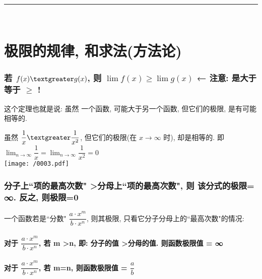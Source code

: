 \documentclass[UTF8]{ctexart}
\begin{document}
~\\
\hrule
~\\


\part{极限的规律, 和求法(方法论)}




\section{若 $ f(x) \textgreater g(x) $, 则 $ \lim f(x) \geq \lim g(x)$  ← 注意: 是大于等于 $\geq$ !}

这个定理也就是说: 虽然 一个函数, 可能大于另一个函数, 但它们的极限, 是有可能相等的. \\

\begin{myEnvSample}
	虽然 $ \dfrac{1} {x} \textgreater \dfrac{1} {x^2}$, 但它们的极限(在 $x \to \infty$ 时), 却是相等的.  即 $ \lim_{n\rightarrow \infty}\dfrac{1}{x}=\lim_{n\rightarrow \infty}\dfrac{1}{x^2}=0
	$ 
	\\
	
	\texttt{[image: /0003.pdf]}
\end{myEnvSample}




\section{分子上``项的最高次数" \textgreater 分母上``项的最高次数", 则 该分式的极限= ∞. 反之, 则极限=0}

一个函数若是``分数" $ \dfrac{a \cdot x^m}{b \cdot x^n} $, 则其极限, 只看它分子分母上的``最高次数"的情况:






\subsection{对于 $ \dfrac{a \cdot x^m}{b \cdot x^n} $, 若 m \textgreater n, 即: 分子的值 \textgreater 分母的值. 则函数极限值 = ∞}






\subsection{对于 $ \dfrac{a \cdot x^m}{b \cdot x^n} $, 若 m=n, 则函数极限值 = $ \dfrac{a} {b}$}
\end{document}
